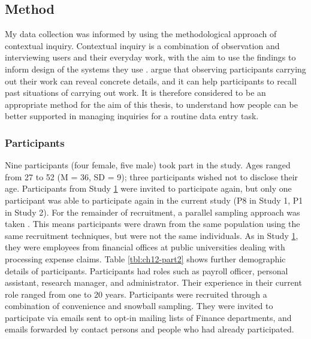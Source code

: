 \subsection{Method}
My data collection was informed by using the methodological approach of contextual inquiry. Contextual inquiry is a combination of observation and interviewing users and their everyday work, with the aim to use the findings to inform design of the systems they use \citep{Holtzblatt2014}.
\citet{Holtzblatt2014} argue that observing participants carrying out their work can reveal concrete details, and it can help participants to recall past situations of carrying out work. It is therefore considered to be an appropriate method for the aim of this thesis, to understand how people can be better supported in managing inquiries for a routine data entry task.

\subsubsection{Participants}
Nine participants (four female, five male) took part in the study. Ages ranged from 27 to 52 (M = 36, SD = 9); three participants wished not to disclose their age. Participants from Study \hyperref[st:Study1]{1} were invited to participate again, but only one participant was able to participate again in the current study (P8 in Study 1, P1 in Study 2).  For the remainder of recruitment, a parallel sampling approach was taken \citep{Onwuegbuzie2008}. This means participants were drawn from the same population using the same recruitment techniques, but were not the same individuals. As in Study \hyperref[st:Study1]{1}, they were employees from financial offices at public universities dealing with processing expense claims. Table \ref{tbl:ch12-part2} shows further demographic details of participants. Participants had roles such as payroll officer, personal assistant, research manager, and administrator. Their experience in their current role ranged from one to 20 years. Participants were recruited through a combination of convenience and snowball sampling. They were invited to participate via emails sent to opt-in mailing lists of Finance departments, and emails forwarded by contact persons and people who had already participated.  

